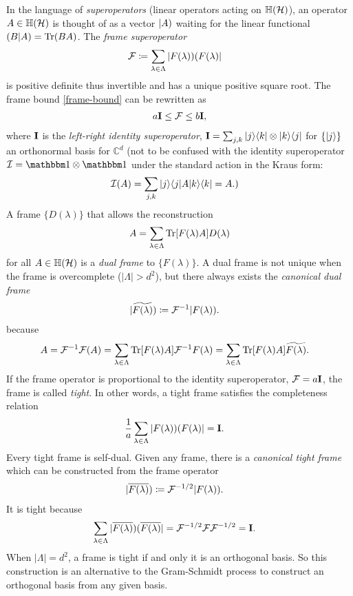 In the language of \emph{superoperators} \cite{caves2014superoperators} (linear operators acting on $\mathbb H(\mathcal{H})$), an operator $A \in \mathbb H(\mathcal{H})$ is thought of as a vector $|A)$ waiting for the linear functional $(B|A) = \mathrm{Tr}(BA)$. The \emph{frame superoperator}
\begin{align}
\mathcal{F} &\coloneqq \sum_{\lambda \in \Lambda} |F(\lambda))(F(\lambda)|
\end{align}
is positive definite thus invertible and has a unique positive square root.
The frame bound \eqref{frame-bound} can be rewritten as
\begin{align}
	a{\bf I} \le \mathcal{F} \le b{\bf I},
\end{align}
where ${\bf I}$ is the \emph{left-right identity superoperator}, ${\bf I} = \sum_{j,k} {\left\vert{j}\right\rangle}{\left\langle{k}\right\vert} \otimes {\left\vert{k}\right\rangle}{\left\langle{j}\right\vert}$ for $\{{\left\vert{j}\right\rangle}\}$ an orthonormal basis for $\mathbb{C}^d$ (not to be confused with the identity superoperator $\mathcal{I} = \id \otimes \id$ under the standard action in the Kraus form:
\begin{align}
	\mathcal{I}(A) &= \sum_{j,k} {\left\vert{j}\right\rangle}{\left\langle{j}\right\vert} A {\left\vert{k}\right\rangle}{\left\langle{k}\right\vert} = A.)
\end{align}
A frame $\{D(\lambda)\}$ that allows the reconstruction
\begin{align}
A = \sum_{\lambda \in \Lambda} \mathrm{Tr} [F(\lambda) A] D(\lambda)
\end{align}
for all $A \in \mathbb H(\mathcal{H})$ is a \emph{dual frame} to $\{F(\lambda)\}$. A dual frame is not unique when the frame is overcomplete ($|\Lambda| > d^2$), but there always exists the \emph{canonical dual frame}
\begin{align}
|\widetilde{F (\lambda)}) &\coloneqq \mathcal{F}^{-1} |F(\lambda)).
\end{align}
because
\begin{align}
A&= \mathcal{F}^{-1} \mathcal{F} (A) = \sum_{\lambda \in \Lambda} \mathrm{Tr} [F(\lambda) A] \mathcal{F}^{-1} F(\lambda) = \sum_{\lambda \in \Lambda} \mathrm{Tr} [F(\lambda) A] \widetilde{F (\lambda)}.
\end{align}
If the frame operator is proportional to the identity superoperator, $\mathcal{F} = a{\bf I}$, the frame is called \emph{tight}. In other words, a tight frame satisfies the completeness relation
\begin{align}
	\frac{1}{a} \sum_{\lambda \in \Lambda} |F(\lambda))(F(\lambda)| &= {\bf I}.
\end{align}
Every tight frame is self-dual. Given any frame, there is a \emph{canonical tight frame} which can be constructed from the frame operator
\begin{align}
	|\overline{F(\lambda)}) &\coloneqq  \mathcal{F}^{-1/2} |F(\lambda)).
\end{align}
It is tight because
\begin{align}
	\sum_{\lambda \in \Lambda} |\overline{F(\lambda)})(\overline{F(\lambda)}|
		&= \mathcal{F}^{-1/2} \mathcal{F} \mathcal{F}^{-1/2}
		= {\bf I}.
\end{align}
When $|\Lambda| = d^2$, a frame is tight if and only it is an orthogonal basis. So this construction is an alternative to the Gram-Schmidt process to construct an orthogonal basis from any given basis.

